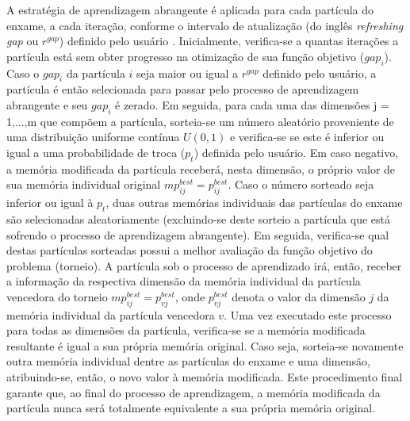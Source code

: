 \documentclass[
	12pt,				%
	openany,			%
	twoside,			%
	a4paper,			%
	chapter=TITLE,		%
	section=Title,		%
	subsection=Title,	%
	subsubsection=Title,%
	english,			%
	french,				%
	spanish,			%
	brazil			%
	]{abntex2}
\begin{document}
\begin{ERRATA}
\begin{itemize}
\end{itemize}

A estratégia de aprendizagem abrangente é aplicada para cada partícula do enxame, a cada iteração, conforme o intervalo de atualização (do inglês \emph{refreshing gap} ou $r^{gap}$) definido pelo usuário \cite{clpso}. Inicialmente, verifica-se a quantas iterações a partícula está sem obter progresso na otimização de sua função objetivo ($gap_i$). Caso o $gap_i$ da partícula $i$ seja maior ou igual a $r^{gap}$ definido pelo usuário, a partícula é então selecionada para passar pelo processo de aprendizagem abrangente e seu $gap_i$ é zerado. Em seguida, para cada uma das dimensões j = 1,...,m que compõem a partícula, sorteia-se um número aleatório proveniente de uma distribuição uniforme contínua $U(0,1)$ e verifica-se se este é inferior ou igual a uma probabilidade de troca ($p_t$) definida pelo usuário. Em caso negativo, a memória modificada da partícula receberá, nesta dimensão, o próprio valor de sua memória individual original $mp^{best}_{ij} = p^{best}_{ij}$. Caso o número sorteado seja inferior ou igual à $p_t$, duas outras memórias individuais das partículas do enxame são selecionadas aleatoriamente (excluindo-se deste sorteio a partícula que está sofrendo o processo de aprendizagem abrangente). Em seguida, verifica-se qual destas partículas sorteadas possui a melhor avaliação da função objetivo do problema (torneio). A partícula sob o processo de aprendizado irá, então, receber a informação da respectiva dimensão da memória individual da partícula vencedora do torneio $mp^{best}_{ij} = p^{best}_{vj}$, onde $p^{best}_{vj}$ denota o valor da dimensão $j$ da memória individual da partícula vencedora $v$. Uma vez executado este processo para todas as dimensões da partícula, verifica-se se a memória modificada resultante é igual a sua própria memória original. Caso seja, sorteia-se novamente outra memória individual dentre as partículas do enxame e uma dimensão, atribuindo-se, então, o novo valor à memória modificada. Este procedimento final garante que, ao final do processo de aprendizagem, a memória modificada da partícula nunca será totalmente equivalente a sua própria memória original.


\end{ERRATA}
\end{document}
